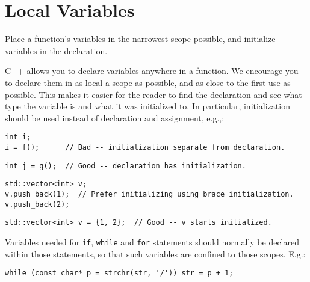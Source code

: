 
\section{Local Variables}\label{sec:local-variables}
Place a function's variables in the narrowest scope possible, and initialize variables in the declaration.

C++ allows you to declare variables anywhere in a function. We encourage you to declare them in as local a scope as possible, and as close to the first use as possible. This makes it easier for the reader to find the declaration and see what type the variable is and what it was initialized to. In particular, initialization should be used instead of declaration and assignment, e.g.,:
\begin{verbatim}
int i;
i = f();      // Bad -- initialization separate from declaration.
\end{verbatim}
\begin{verbatim}
int j = g();  // Good -- declaration has initialization.
\end{verbatim}
\begin{verbatim}
std::vector<int> v;
v.push_back(1);  // Prefer initializing using brace initialization.
v.push_back(2);
\end{verbatim}
\begin{verbatim}
std::vector<int> v = {1, 2};  // Good -- v starts initialized.
\end{verbatim}
Variables needed for \texttt{if}, \texttt{while} and \texttt{for} statements should normally be declared within those statements, so that such variables are confined to those scopes. E.g.:
\begin{verbatim}
while (const char* p = strchr(str, '/')) str = p + 1;
\end{verbatim}

